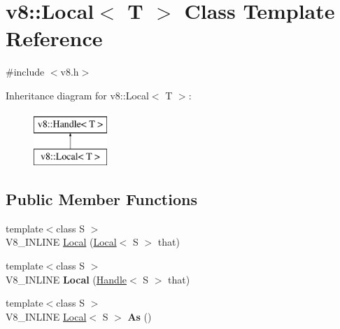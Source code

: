 \hypertarget{classv8_1_1Local}{}\section{v8\+:\+:Local$<$ T $>$ Class Template Reference}
\label{classv8_1_1Local}


{\ttfamily \#include $<$v8.\+h$>$}

Inheritance diagram for v8\+:\+:Local$<$ T $>$\+:\begin{figure}[H]
\begin{center}
\leavevmode
\includegraphics[height=2.000000cm]{classv8_1_1Local}
\end{center}
\end{figure}
\subsection*{Public Member Functions}
\begin{DoxyCompactItemize}
\item 
{\footnotesize template$<$class S $>$ }\\V8\+\_\+\+I\+N\+L\+I\+N\+E \hyperlink{classv8_1_1Local_a18d761713c1062a38f58a568fffe8f80}{Local} (\hyperlink{classv8_1_1Local}{Local}$<$ S $>$ that)
\item 
\hypertarget{classv8_1_1Local_a857c392e721d98a691cf638cc9ea1e8e}{}{\footnotesize template$<$class S $>$ }\\V8\+\_\+\+I\+N\+L\+I\+N\+E {\bfseries Local} (\hyperlink{classv8_1_1Handle}{Handle}$<$ S $>$ that)\label{classv8_1_1Local_a857c392e721d98a691cf638cc9ea1e8e}

\item 
\hypertarget{classv8_1_1Local_a18b55bc71ce2dcd084887097be4399eb}{}{\footnotesize template$<$class S $>$ }\\V8\+\_\+\+I\+N\+L\+I\+N\+E \hyperlink{classv8_1_1Local}{Local}$<$ S $>$ {\bfseries As} ()\label{classv8_1_1Local_a18b55bc71ce2dcd084887097be4399eb}

\end{DoxyCompactItemize}
